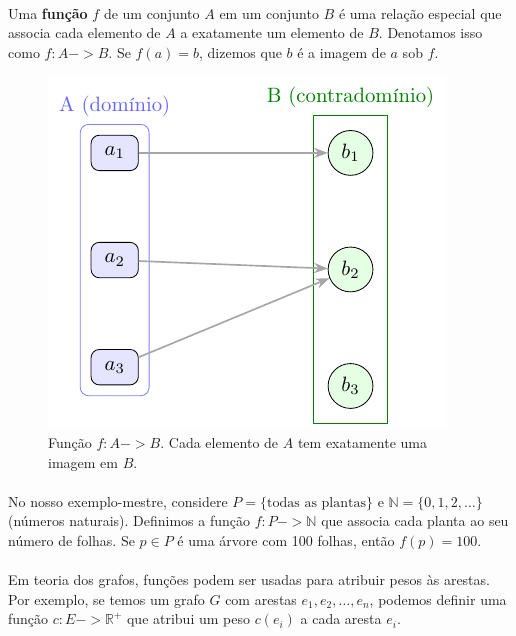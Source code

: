 \documentclass[12pt,a4paper]{article}
\def\emph#1{#1}%
\def\to{->}%
\begin{document}
\paragraph{}
Uma \textbf{função} \(f\) de um conjunto \(A\) em um conjunto \(B\) é uma relação especial que associa cada elemento de \(A\) a exatamente um elemento de \(B\). Denotamos isso como \(f: A \to B\). Se \(f(a) = b\), dizemos que \(b\) é a imagem de \(a\) sob \(f\).


\begin{figure}[H]
    \centering
    \includegraphics[width=0.9\linewidth]{figures/fig_funcao.pdf}

    \caption{Função $f\!:\!A\to B$. Cada elemento de $A$ tem \emph{exatamente uma} imagem em $B$.}
    \label{fig:funcao}
    \end{figure}


\paragraph{}
No nosso exemplo-mestre, considere \(P=\{\text{todas as plantas}\}\) e \(\mathbb{N}=\{0,1,2,\ldots\}\) (números naturais). Definimos a função \(f: P \to \mathbb{N}\) que associa cada planta ao seu número de folhas. Se \(p \in P\) é uma árvore com 100 folhas, então \(f(p) = 100\).

\paragraph{}
Em teoria dos grafos, funções podem ser usadas para atribuir pesos às arestas. Por exemplo, se temos um grafo \(G\) com arestas \(e_1, e_2, \ldots, e_n\), podemos definir uma função \(c: E \to \mathbb{R}^+\) que atribui um peso \(c(e_i)\) a cada aresta \(e_i\).
\end{document}
